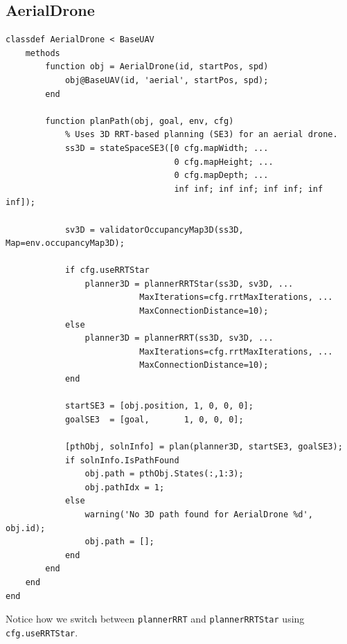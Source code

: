 \documentclass[12pt,a4paper]{report}
\begin{document}
\subsection{AerialDrone}
\label{sec:aerial_drone}
\begin{verbatim}
classdef AerialDrone < BaseUAV
    methods
        function obj = AerialDrone(id, startPos, spd)
            obj@BaseUAV(id, 'aerial', startPos, spd);
        end

        function planPath(obj, goal, env, cfg)
            % Uses 3D RRT-based planning (SE3) for an aerial drone.
            ss3D = stateSpaceSE3([0 cfg.mapWidth; ...
                                  0 cfg.mapHeight; ...
                                  0 cfg.mapDepth; ...
                                  inf inf; inf inf; inf inf; inf inf]);

            sv3D = validatorOccupancyMap3D(ss3D, Map=env.occupancyMap3D);

            if cfg.useRRTStar
                planner3D = plannerRRTStar(ss3D, sv3D, ...
                           MaxIterations=cfg.rrtMaxIterations, ...
                           MaxConnectionDistance=10);
            else
                planner3D = plannerRRT(ss3D, sv3D, ...
                           MaxIterations=cfg.rrtMaxIterations, ...
                           MaxConnectionDistance=10);
            end

            startSE3 = [obj.position, 1, 0, 0, 0];
            goalSE3  = [goal,       1, 0, 0, 0];

            [pthObj, solnInfo] = plan(planner3D, startSE3, goalSE3);
            if solnInfo.IsPathFound
                obj.path = pthObj.States(:,1:3);
                obj.pathIdx = 1;
            else
                warning('No 3D path found for AerialDrone %d', obj.id);
                obj.path = [];
            end
        end
    end
end
\end{verbatim}
Notice how we switch between \texttt{plannerRRT} and \texttt{plannerRRTStar} 
using \texttt{cfg.useRRTStar}.
\end{document}
